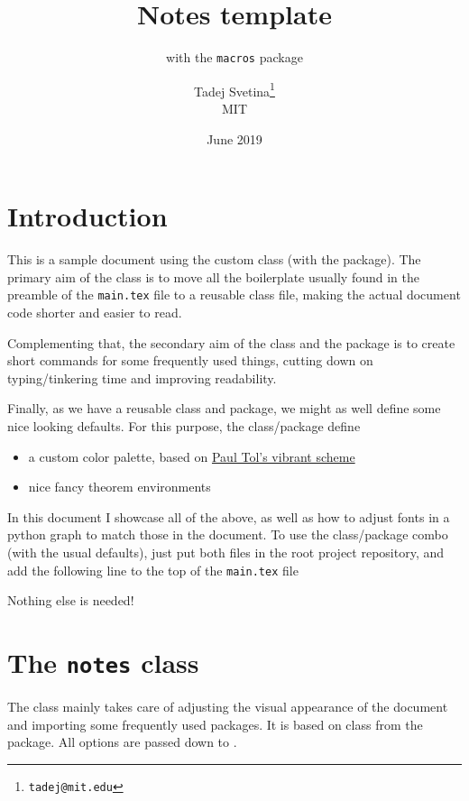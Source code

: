 \documentclass{notes}
\title{Notes template}
\subtitle{with the \texttt{macros} package}
\author{Tadej Svetina\thanks{\texttt{tadej@mit.edu}}\\MIT}
\date{June 2019}
\begin{document}
\maketitle

\tableofcontents

\section{Introduction}
This is a sample document using the custom  class (with the  package). The primary aim of the  class is to move all the boilerplate usually found in the preamble of the \texttt{main.tex} file to a reusable class file, making the actual document code shorter and easier to read.

Complementing that, the secondary aim of the  class and the  package is to create short commands for some frequently used things, cutting down on typing/tinkering time and improving readability.

Finally, as we have a reusable class and package, we might as well define some nice looking defaults. For this purpose, the class/package define
\begin{itemize}
    \item a custom color palette, based on \href{https://personal.sron.nl/~pault/}{Paul Tol's vibrant scheme}
    \item nice fancy theorem environments
\end{itemize}

In this document I showcase all of the above, as well as how to adjust fonts in a python graph to match those in the document. To use the class/package combo (with the usual defaults), just put both files in the root project repository, and add the following line to the top of the \texttt{main.tex} file
Nothing else is needed!

\section{The \texttt{notes} class}

The class mainly takes care of adjusting the visual appearance of the document and importing some frequently used packages. It is based on  class from the  package. All options are passed down to . 
\end{document}
